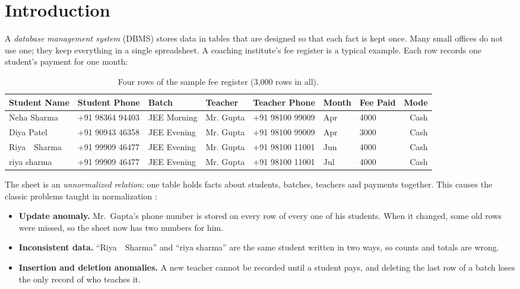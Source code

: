 \chapter{Introduction}
\label{ch:introduction}

A \emph{database management system} (DBMS) stores data in tables that are designed so that each fact is
kept once. Many small offices do not use one; they keep everything in a single spreadsheet. A coaching
institute's fee register is a typical example. Each row records one student's payment for one month:

\begin{table}[htbp]
\centering
\caption[Part of the fee register]{Four rows of the sample fee register (3{,}000 rows in all).}
\label{tab:sheet}
\scriptsize\setlength{\tabcolsep}{3.5pt}
\begin{tabular}{@{}lllllllr@{}}
\toprule
Student Name & Student Phone & Batch & Teacher & Teacher Phone & Month & Fee Paid & Mode \\
\midrule
Neha Sharma & +91 98364 94403 & JEE Morning & Mr. Gupta & +91 98100 99009 & Apr & 4000 & Cash \\
Diya Patel & +91 90943 46358 & JEE Evening & Mr. Gupta & +91 98100 99009 & Apr & 3000 & Cash \\
Riya\ \ Sharma & +91 99909 46477 & JEE Evening & Mr. Gupta & +91 98100 11001 & Jun & 4000 & Cash \\
riya sharma & +91 99909 46477 & JEE Evening & Mr. Gupta & +91 98100 11001 & Jul & 4000 & Cash \\
\bottomrule
\end{tabular}
\end{table}

The sheet is an \emph{unnormalized relation}: one table holds facts about students, batches, teachers
and payments together. This causes the classic problems taught in normalization \cite{silberschatz2019}:

\begin{itemize}
  \item \textbf{Update anomaly.} Mr.\ Gupta's phone number is stored on every row of every one of his
  students. When it changed, some old rows were missed, so the sheet now has two numbers for him.
  \item \textbf{Inconsistent data.} ``Riya\ \ Sharma'' and ``riya sharma'' are the same student written in
  two ways, so counts and totals are wrong.
  \item \textbf{Insertion and deletion anomalies.} A new teacher cannot be recorded until a student pays,
  and deleting the last row of a batch loses the only record of who teaches it.
\end{itemize}

